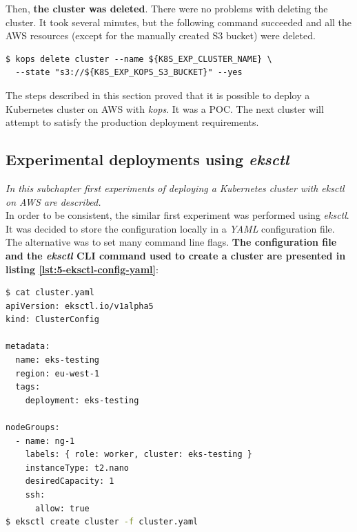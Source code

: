 Then, \textbf{the cluster was deleted}. There were no problems with deleting the cluster. It took several minutes, but the following command succeeded and all the AWS resources (except for the manually created S3 bucket) were deleted.

\begin{lstlisting}[basicstyle=\scriptsize,xleftmargin=0cm,caption={Command used to delete a Kubernetes cluster created with \textit{kops}}]
$ kops delete cluster --name ${K8S_EXP_CLUSTER_NAME} \
  --state "s3://${K8S_EXP_KOPS_S3_BUCKET}" --yes
\end{lstlisting}

The steps described in this section proved that it is possible to deploy a Kubernetes cluster on AWS with \textit{kops}. It was a POC. The next cluster will attempt to satisfy the production deployment requirements.

\subsection{Experimental deployments using \textit{eksctl}}
\textit{In this subchapter first experiments of deploying a Kubernetes cluster with \textit{eksctl} on AWS are described.}
\\

In order to be consistent, the similar first experiment was performed using \textit{eksctl}. It was decided to store the configuration locally in a \textit{YAML} configuration file. The alternative was to set many command line flags. \textbf{The configuration file and  the \textit{eksctl} CLI command used to create a cluster are presented in listing \ref{lst:5-eksctl-config-yaml}}:
\begin{lstlisting}[basicstyle=\scriptsize,xleftmargin=0cm,caption={Commands used to create a cluster with \textit{eksctl}, without prerequisite steps performed},captionpos=b,language=Bash,label=lst:5-eksctl-config-yaml]
$ cat cluster.yaml
apiVersion: eksctl.io/v1alpha5
kind: ClusterConfig

metadata:
  name: eks-testing
  region: eu-west-1
  tags:
    deployment: eks-testing

nodeGroups:
  - name: ng-1
    labels: { role: worker, cluster: eks-testing }
    instanceType: t2.nano
    desiredCapacity: 1
    ssh:
      allow: true
$ eksctl create cluster -f cluster.yaml
\end{lstlisting}

